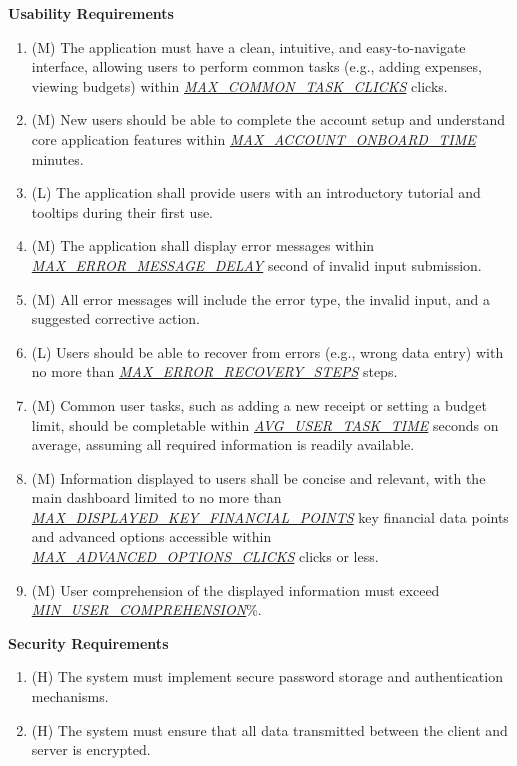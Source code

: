 \documentclass[12pt]{article}
\begin{document}
\textbf{Usability Requirements}\label{NFR-USAB}
\begin{enumerate}[label=NFR-USAB-\arabic*]
  \item (M) The application must have a clean, intuitive, and easy-to-navigate
  interface, allowing users to perform common tasks (e.g., adding expenses,
  viewing budgets) within
  \hyperref[Table:AuxConstants]{\textit{MAX\_COMMON\_TASK\_CLICKS}} clicks.
  \item (M) New users should be able to complete the account setup and
  understand core application features within
  \hyperref[Table:AuxConstants]{\textit{MAX\_ACCOUNT\_ONBOARD\_TIME}} minutes.
  \item (L) The application shall provide users with an introductory tutorial and
  tooltips during their first use.
  \item (M) The application shall display error messages within
  \hyperref[Table:AuxConstants]{\textit{MAX\_ERROR\_MESSAGE\_DELAY}} second of
  invalid input submission.
  \item (M) All error messages will include the error type, the invalid 
  input, and a suggested corrective action.
  \item (L) Users should be able to recover from errors (e.g., wrong data entry)
  with no more than
  \hyperref[Table:AuxConstants]{\textit{MAX\_ERROR\_RECOVERY\_STEPS}} steps.
  \item (M) Common user tasks, such as adding a new receipt or setting a budget
  limit, should be completable within
  \hyperref[Table:AuxConstants]{\textit{AVG\_USER\_TASK\_TIME}} seconds on
  average, assuming all required information is readily available.
  \item (M) Information displayed to users shall be concise and relevant, with
  the main dashboard limited to no more than
  \hyperref[Table:AuxConstants]{\textit{MAX\_DISPLAYED\_KEY\_FINANCIAL\_POINTS}}
  key financial data points and advanced options accessible within
  \hyperref[Table:AuxConstants]{\textit{MAX\_ADVANCED\_OPTIONS\_CLICKS}} clicks or less.
  \item (M) User comprehension of the displayed information must exceed\\
  \hyperref[Table:AuxConstants]{\textit{MIN\_USER\_COMPREHENSION}}\%.
\end{enumerate}

\textbf{Security Requirements}
\begin{enumerate}[label=NFR-SEC-\arabic*]\label{NFR-SEC}
  \item (H) The system must implement secure password storage and authentication
  mechanisms.
  \item (H) The system must ensure that all data transmitted between the client and
  server is encrypted.
\end{enumerate}
\end{document}
